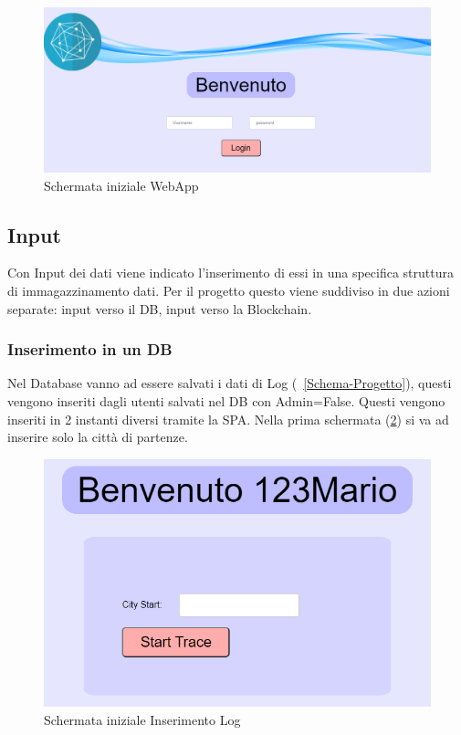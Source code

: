 \documentclass[11pt,a4paper,titlepage]{report}
\begin{document}
\begin{figure}[h]
	\includegraphics[width=\textwidth]{HomePage}
	\centering
	\caption{Schermata iniziale WebApp}
	\label{fig:HomePage}
\end{figure}

\subsection{Input}
Con Input dei dati viene indicato l'inserimento di essi in una specifica struttura di immagazzinamento dati. Per il progetto questo viene suddiviso in due azioni separate: input verso il DB, input verso la Blockchain.
\subsubsection{Inserimento in un DB}
Nel Database vanno ad essere salvati i dati di Log (~\ref{Schema-Progetto}), questi vengono inseriti dagli utenti salvati nel DB con Admin=False. Questi vengono inseriti in 2 instanti diversi tramite la SPA.
Nella prima schermata (\ref{fig:Init_Log}) si va ad inserire solo la città di partenze.
\begin{figure}[h]
	\includegraphics[width=\textwidth]{Init_Log}
	\centering
	\caption{Schermata iniziale Inserimento Log}
	\label{fig:Init_Log}
\end{figure}
\end{document}
